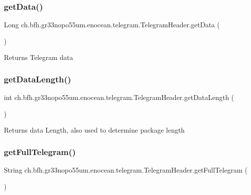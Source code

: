 \subsubsection{\texorpdfstring{get\+Data()}{getData()}}
{\footnotesize\ttfamily Long ch.\+bfh.\+gr33nopo55um.\+enocean.\+telegram.\+Telegram\+Header.\+get\+Data (\begin{DoxyParamCaption}{ }\end{DoxyParamCaption})}

\begin{DoxyReturn}{Returns}
Telegram data 
\end{DoxyReturn}
\hypertarget{classch_1_1bfh_1_1gr33nopo55um_1_1enocean_1_1telegram_1_1_telegram_header_ab126d3782df92b82fbd671f84dc226fe}{}\label{classch_1_1bfh_1_1gr33nopo55um_1_1enocean_1_1telegram_1_1_telegram_header_ab126d3782df92b82fbd671f84dc226fe} 
\subsubsection{\texorpdfstring{get\+Data\+Length()}{getDataLength()}}
{\footnotesize\ttfamily int ch.\+bfh.\+gr33nopo55um.\+enocean.\+telegram.\+Telegram\+Header.\+get\+Data\+Length (\begin{DoxyParamCaption}{ }\end{DoxyParamCaption})}

\begin{DoxyReturn}{Returns}
data Length, also used to determine package length 
\end{DoxyReturn}
\hypertarget{classch_1_1bfh_1_1gr33nopo55um_1_1enocean_1_1telegram_1_1_telegram_header_a018ed11b560f0ec305b1fc1c5c35de6f}{}\label{classch_1_1bfh_1_1gr33nopo55um_1_1enocean_1_1telegram_1_1_telegram_header_a018ed11b560f0ec305b1fc1c5c35de6f} 
\subsubsection{\texorpdfstring{get\+Full\+Telegram()}{getFullTelegram()}}
{\footnotesize\ttfamily String ch.\+bfh.\+gr33nopo55um.\+enocean.\+telegram.\+Telegram\+Header.\+get\+Full\+Telegram (\begin{DoxyParamCaption}{ }\end{DoxyParamCaption})}


